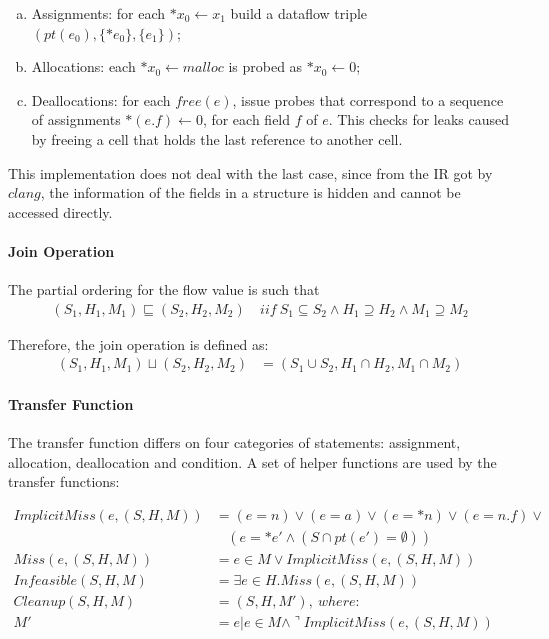 \begin{enumerate}[(a)]
  \item Assignments: for each $*x_0\gets x_1$ build a dataflow triple 
    $(pt(e_0),\{*e_0\},\{e_1\})$;
  \item Allocations: each $*x_0\gets malloc$ is probed as $*x_0\gets 0$;
  \item Deallocations: for each $free(e)$, issue probes that correspond to a 
    sequence of assignments $*(e.f)\gets 0$, for each field $f$ of $e$. This 
    checks for leaks caused by freeing a cell that holds the last reference 
    to another cell.
\end{enumerate}

This implementation does not deal with the last case, since from the 
\llvm IR got by $clang$, the information of the fields in a structure is 
hidden and cannot be accessed directly.

\paragraph{Join Operation}

The partial ordering for the flow value is such that 
\begin{align*}
  (S_1,H_1,M_1)\sqsubseteq (S_2,H_2,M_2) \ &iif \ 
  S_1\subseteq S_2 \wedge H_1\supseteq H_2 \wedge M_1\supseteq M_2
\end{align*}

Therefore, the join operation is defined as:
\begin{align*}
  (S_1,H_1,M_1)\sqcup (S_2,H_2,M_2) &= (S_1\cup S_2,H_1\cap H_2,M_1\cap M_2)
\end{align*}


\paragraph{Transfer Function}

The transfer function differs on four categories of statements: assignment, 
allocation, deallocation and condition. A set of helper functions are used 
by the transfer functions:

\begin{align*}
  ImplicitMiss(e,(S,H,M)) &= (e=n) \vee (e=a) \vee (e=*n) \vee (e=n.f) \vee \\
                          &\ \ \ \ (e=*e' \wedge (S\cap pt(e')=\emptyset)) \\
  Miss(e,(S,H,M)) &= e\in M \vee ImplicitMiss(e,(S,H,M)) \\
Infeasible(S,H,M) &= \exists e \in H. Miss(e,(S,H,M)) \\
   Cleanup(S,H,M) &= (S,H,M'), \ where: \\
  M' &= {e|e\in M \wedge \urcorner ImplicitMiss(e,(S,H,M))} \\
\end{align*}

